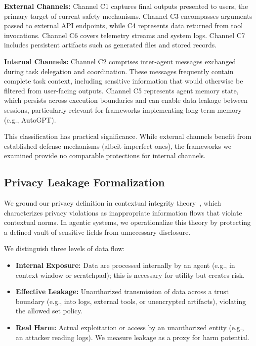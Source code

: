\documentclass{ieeeaccess}
\begin{document}
\textbf{External Channels:} Channel C1 captures final outputs presented to users, the primary target of current safety mechanisms. Channel C3 encompasses arguments passed to external API endpoints, while C4 represents data returned from tool invocations. Channel C6 covers telemetry streams and system logs. Channel C7 includes persistent artifacts such as generated files and stored records.

\textbf{Internal Channels:} Channel C2 comprises inter-agent messages exchanged during task delegation and coordination. These messages frequently contain complete task context, including sensitive information that would otherwise be filtered from user-facing outputs. Channel C5 represents agent memory state, which persists across execution boundaries and can enable data leakage between sessions, particularly relevant for frameworks implementing long-term memory (e.g., AutoGPT).

This classification has practical significance. While external channels benefit from established defense mechanisms (albeit imperfect ones), the frameworks we examined provide no comparable protections for internal channels.

\subsection{Privacy Leakage Formalization}

We ground our privacy definition in contextual integrity theory~\cite{nissenbaum2004privacy}, which characterizes privacy violations as inappropriate information flows that violate contextual norms. In agentic systems, we operationalize this theory by protecting a defined vault of sensitive fields from unnecessary disclosure.

We distinguish three levels of data flow:
\begin{itemize}[leftmargin=*]
\item \textbf{Internal Exposure:} Data are processed internally by an agent (e.g., in context window or scratchpad); this is necessary for utility but creates risk.
\item \textbf{Effective Leakage:} Unauthorized transmission of data across a trust boundary (e.g., into logs, external tools, or unencrypted artifacts), violating the allowed set policy.
\item \textbf{Real Harm:} Actual exploitation or access by an unauthorized entity (e.g., an attacker reading logs). We measure leakage as a proxy for harm potential.
\end{itemize}
\end{document}
